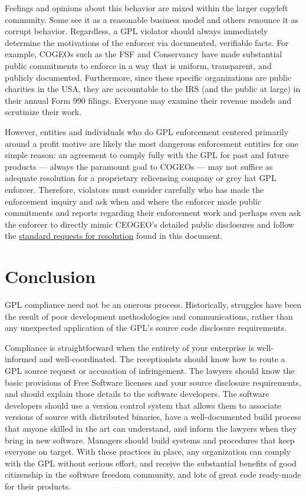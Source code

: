 Feelings and opinions about this behavior are mixed within the larger
copyleft community.  Some see it as a reasonable business model and others
renounce it as corrupt behavior.  Regardless, a GPL
violator should always immediately determine the motivations of the
enforcer via documented, verifiable facts.  For example, COGEOs such as the FSF and Conservancy have made substantial
public commitments to enforce in a way that is uniform, transparent, and
publicly documented.  Furthermore, since these specific organizations are
public charities in the USA, they
are accountable to the IRS (and the public at large) in their annual Form 990
filings.   Everyone may examine their revenue models and scrutinize their
work.

However, entities and individuals who do GPL enforcement centered primarily
around a profit motive are likely the most dangerous enforcement entities for
one simple reason: an agreement to comply fully with the GPL for past and
future products --- always the paramount goal to COGEOs --- may not suffice as
adequate resolution for a proprietary relicensing company or grey hat GPL
enforcer.  Therefore, violators must consider carefully who has
made the enforcement inquiry and ask when and where the enforcer made public
commitments and reports regarding their enforcement work and perhaps even ask
the enforcer to directly mimic CEOGEO's detailed public disclosures and
follow the \hyperref[enforcement-standard-requests]{standard requests for
  resolution} found in this document.

\chapter{Conclusion}

GPL compliance need not be an onerous process.  Historically, struggles
have been the result of poor development methodologies and communications,
rather than any unexpected application of the GPL's source code disclosure
requirements.

Compliance is straightforward when the entirety of your enterprise is
well-informed and well-coordinated.  The receptionists should know how to
route a GPL source request or accusation of infringement.  The lawyers
should know the basic provisions of Free Software licenses and your source
disclosure requirements, and should explain those details to the software
developers.  The software developers should use a version control system
that allows them to associate versions of source with distributed
binaries, have a well-documented build process that anyone skilled in the
art can understand, and inform the lawyers when they bring in new
software.  Managers should build systems and procedures that keep everyone
on target.  With these practices in place, any organization can comply
with the GPL without serious effort, and receive the substantial benefits
of good citizenship in the software freedom community, and lots of great code
ready-made for their products.

